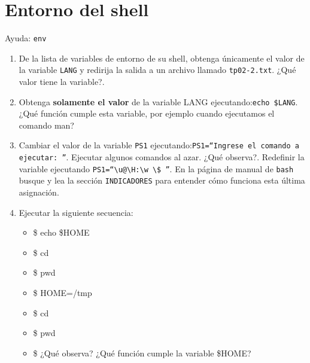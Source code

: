 \documentclass[12pt]{article}
\begin{document}
\section*{Entorno del shell}
Ayuda: \texttt{env}
\begin{enumerate}
\item De la lista de variables de entorno de su shell, obtenga únicamente el valor de la variable \texttt{LANG} y redirija la salida a un archivo llamado \texttt{tp02-2.txt}. ¿Qué valor tiene la variable?.

\item Obtenga \textbf{solamente el valor} de la variable LANG ejecutando:\texttt{echo \$LANG}. ¿Qué función cumple esta variable, por ejemplo cuando ejecutamos el comando man? 
\item Cambiar el valor de la variable \texttt{PS1} ejecutando:\texttt{PS1=``Ingrese el comando a ejecutar: ''}.
Ejecutar algunos comandos al azar. ¿Qué observa?. Redefinir la variable ejecutando
\texttt{PS1=``\textbackslash u@\textbackslash H:\textbackslash w \textbackslash \$ ''}.
En la página de manual de \texttt{bash} busque y lea la sección \texttt{INDICADORES} para entender cómo funciona esta última asignación.
\item Ejecutar la siguiente secuencia:
	\begin{itemize}
	\item \$ echo \$HOME
	\item \$ cd 
	\item \$ pwd
	\item \$ HOME=/tmp
	\item \$ cd 
	\item \$ pwd
	\item \$ ¿Qué observa? ¿Qué función cumple la variable \$HOME?
	\end{itemize}
\end{enumerate}
\end{document}
